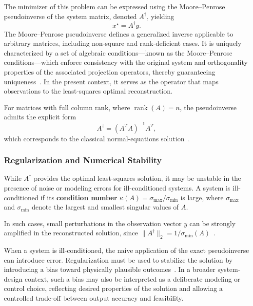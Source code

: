 The minimizer of this problem can be expressed using the Moore--Penrose pseudoinverse of the system matrix, denoted $A^\dagger$, yielding
\[
x^\star = A^\dagger y.
\]
The Moore--Penrose pseudoinverse defines a generalized inverse applicable to arbitrary matrices, including non-square and rank-deficient cases. It is uniquely characterized by a set of algebraic conditions—known as the Moore--Penrose conditions—which enforce consistency with the original system and orthogonality properties of the associated projection operators, thereby guaranteeing uniqueness~\cite{penrose-1955}. In the present context, it serves as the operator that maps observations to the least-squares optimal reconstruction.

For matrices with full column rank, where $\operatorname{rank}(A) = n$, the pseudoinverse admits the explicit form
\[
A^{\dagger} = (A^{T}A)^{-1}A^{T},
\]
which corresponds to the classical normal-equations solution~\cite{bindel-2012}.



\subsubsection{Regularization and Numerical Stability}

While $A^{\dagger}$ provides the optimal least-squares solution, it may be unstable in the presence of noise or modeling errors for ill-conditioned systems. A system is ill-conditioned if its \textbf{condition number} $\kappa(A) = \sigma_{\max}/\sigma_{\min}$ is large, where $\sigma_{\max}$  and $\sigma_{\min}$ denote the largest and smallest singular values of $A$.

In such cases, small perturbations in the observation vector $y$ can be strongly amplified in the reconstructed solution, since $\|A^{\dagger}\|_2 = 1/\sigma_{\min}(A)$~\cite{golub-2013, mueller-2012}.

When a system is ill-conditioned, the naive application of the exact pseudoinverse can introduce error. Regularization must be used to stabilize the solution by introducing a bias toward physically plausible outcomes~\cite{mueller-2012}. In a broader system-design context, such a bias may also be interpreted as a deliberate modeling or control choice, reflecting desired properties of the solution and allowing a controlled trade-off between output accuracy and feasibility.


